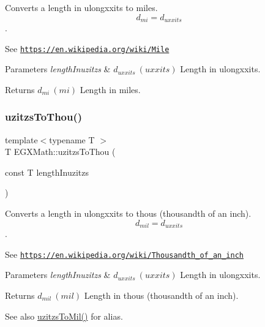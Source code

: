 Converts a length in ulongxxits to miles. \[ d_{mi}=d_{uxxits} \]. 

See \href{https://en.wikipedia.org/wiki/Mile}{\tt https\+://en.\+wikipedia.\+org/wiki/\+Mile} 
\begin{DoxyParams}{Parameters}
{\em length\+Inuzitzs} & $ d_{uxxits}\ (uxxits)$ Length in ulongxxits. \\
\hline
\end{DoxyParams}
\begin{DoxyReturn}{Returns}
$ d_{mi}\ (mi)$ Length in miles. 
\end{DoxyReturn}
\mbox{\label{group___e_g_x_math-_conversions-_length_conversions-uzitzs-_imperial_gaa11694f9026bf30e29bd716a35c05b4e}} 
\subsubsection{\texorpdfstring{uzitzs\+To\+Thou()}{uzitzsToThou()}}
{\footnotesize\ttfamily template$<$typename T $>$ \\
T E\+G\+X\+Math\+::uzitzs\+To\+Thou (\begin{DoxyParamCaption}\item[{const T}]{length\+Inuzitzs }\end{DoxyParamCaption})}



Converts a length in ulongxxits to thous (thousandth of an inch). \[ d_{mil}=d_{uxxits} \]. 

See \href{https://en.wikipedia.org/wiki/Thousandth_of_an_inch}{\tt https\+://en.\+wikipedia.\+org/wiki/\+Thousandth\+\_\+of\+\_\+an\+\_\+inch} 
\begin{DoxyParams}{Parameters}
{\em length\+Inuzitzs} & $ d_{uxxits}\ (uxxits)$ Length in ulongxxits. \\
\hline
\end{DoxyParams}
\begin{DoxyReturn}{Returns}
$ d_{mil}\ (mil)$ Length in thous (thousandth of an inch). 
\end{DoxyReturn}
\begin{DoxySeeAlso}{See also}
\mbox{\hyperlink{group___e_g_x_math-_conversions-_length_conversions-uzitzs-_imperial_ga53d4abecb2e7ac39c15c4ef89b9447a9}{uzitzs\+To\+Mil()}} for alias. 
\end{DoxySeeAlso}
\mbox{\label{group___e_g_x_math-_conversions-_length_conversions-uzitzs-_imperial_ga3281bb64c81bc68a166a47ccc1f9a146}} 
